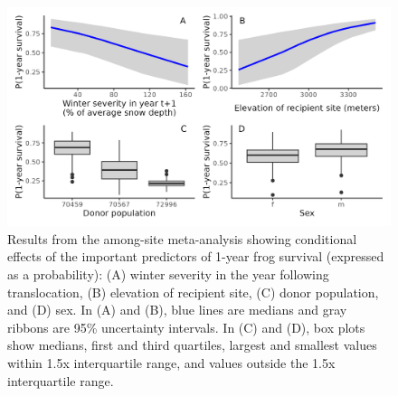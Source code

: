 \documentclass[9pt,twocolumn,twoside,lineno]{pnas-new}
\begin{document}
\begin{figure}

{\centering \includegraphics[width=\textwidth]{figures/cond_effects_plot.png}

}

\caption{\label{fig-cond-effects}Results from the among-site
meta-analysis showing conditional effects of the important predictors of
1-year frog survival (expressed as a probability): (A) winter severity
in the year following translocation, (B) elevation of recipient site,
(C) donor population, and (D) sex. In (A) and (B), blue lines are
medians and gray ribbons are 95\% uncertainty intervals. In (C) and (D),
box plots show medians, first and third quartiles, largest and smallest
values within 1.5x interquartile range, and values outside the 1.5x
interquartile range.}

\end{figure}

\newpage
\end{document}
